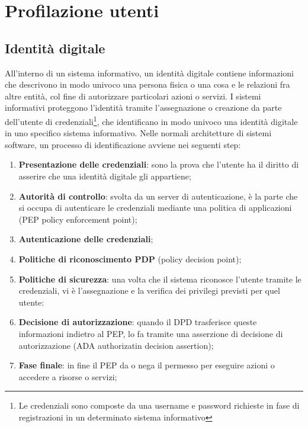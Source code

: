 \chapter{Profilazione utenti}


\section{Identità digitale}
All'interno di un sistema informativo, un identità digitale contiene informazioni che descrivono in modo univoco una persona fisica o una cosa e le relazioni fra altre entità, col fine di autorizzare particolari azioni o servizi.\cite{identita_digitale_definizione} I sistemi informativi proteggono l'identità tramite l'assegnazione o creazione da parte dell'utente di credenziali\footnote{Le credenziali sono composte da una username e password richieste in fase di registrazioni in un determinato sistema informativo}, che identificano in modo univoco una identità digitale in uno specifico sistema informativo.
Nelle normali architetture di sistemi software, un processo di identificazione avviene nei seguenti step:
\begin{enumerate}
  \item \textbf{Presentazione delle credenziali}: sono la prova che l'utente ha il diritto di asserire che una identità digitale gli appartiene; 
  \item \textbf{Autorità di controllo}: svolta da un server di autenticazione, è la parte che si occupa di autenticare le credenziali mediante una politica di applicazioni (PEP policy enforcement point);
  \item \textbf{Autenticazione delle credenziali};
  \item \textbf{Politiche di riconoscimento PDP} (policy decision point);
  \item \textbf{Politiche di sicurezza}: una volta che il sistema riconosce l'utente tramite le credenziali, vi è l'assegnazione e la verifica dei privilegi previsti per quel utente:
  \item \textbf{Decisione di autorizzazione}: quando il DPD trasferisce queste informazioni indietro al PEP, lo fa tramite una asserzione di decisione di autorizzazione (ADA authorizatin decision assertion);
  \item \textbf{Fase finale}: in fine il PEP da o nega il permesso per eseguire azioni o accedere a risorse o servizi;
\end{enumerate}

